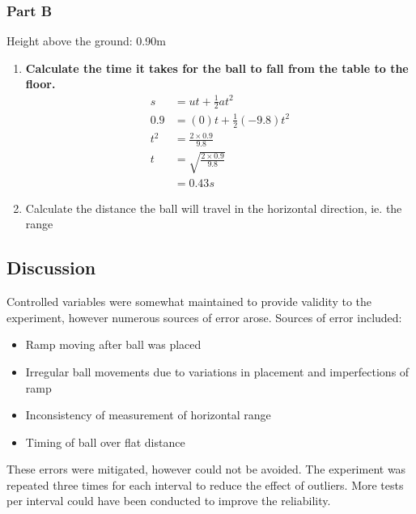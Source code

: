 		\subsubsection{Part B}
			Height above the ground: 0.90m
			\begin{enumerate}
				\item \textbf{Calculate the time it takes for the ball to fall from the table to the floor.}
					\begin{align}
						s &= ut + \frac{1}{2}at^2 \\
						0.9 &= (0)t + \frac{1}{2}(-9.8)t^2 \\
						t^2 &= \frac{2 \times 0.9}{9.8} \\
						t &= \sqrt{\frac{2 \times 0.9}{9.8}} \\
						&= 0.43 s
					\end{align} 
				\item Calculate the distance the ball will travel in the horizontal direction, ie. the range
			\end{enumerate}

	\subsection{Discussion}
		Controlled variables were somewhat maintained to provide validity to the experiment, however numerous sources of error arose. Sources of error included:
		\begin{itemize}
			\item Ramp moving after ball was placed
			\item Irregular ball movements due to variations in placement and imperfections of ramp
			\item Inconsistency of measurement of horizontal range
			\item Timing of ball over flat distance
		\end{itemize}
		These errors were mitigated, however could not be avoided. The experiment was repeated three times for each interval to reduce the effect of outliers. More tests per interval could have been conducted to improve the reliability.
	
